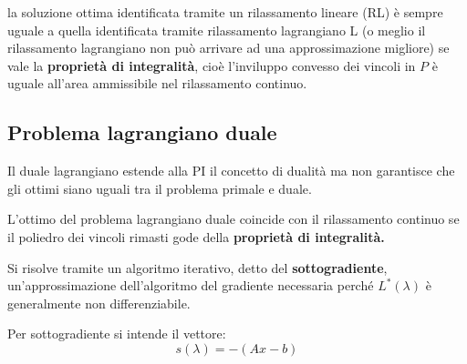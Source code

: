 \documentclass[\main/main.tex]{subfiles}
\begin{document}
\begin{theorem}
  la soluzione ottima identificata tramite un rilassamento lineare (RL) è sempre uguale a quella identificata tramite rilassamento lagrangiano L (o meglio il rilassamento lagrangiano non può arrivare ad una approssimazione migliore) se vale la \textbf{proprietà di integralità}, cioè l'inviluppo convesso dei vincoli in $P$ è uguale all'area ammissibile nel rilassamento continuo.
\end{theorem}

\subsection{Problema lagrangiano duale}
Il duale lagrangiano estende alla PI il concetto di dualità ma non garantisce che gli ottimi siano uguali tra il problema primale e duale.

\begin{theorem}
  L'ottimo del problema lagrangiano duale coincide con il rilassamento continuo se il poliedro dei vincoli rimasti gode della \textbf{proprietà di integralità.}
\end{theorem}

Si risolve tramite un algoritmo iterativo, detto del \textbf{sottogradiente}, un'approssimazione dell'algoritmo del gradiente necessaria perché $L^*(\lambda)$ è generalmente non differenziabile.

\begin{definition}[Sottogradiente]
  Per sottogradiente si intende il vettore:
  \[
    s(\lambda) = -(Ax-b)
  \]
\end{definition}
\end{document}
